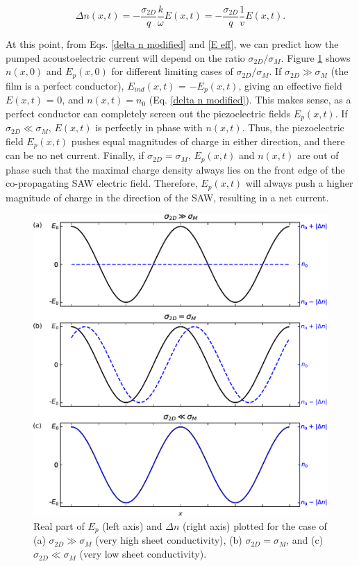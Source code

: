 \documentclass[double,12pt,1in]{beavtex}
\begin{document}
\begin{equation}
    \Delta n(x,t) = -\frac{\sigma_{2D}}{q} \frac{k}{\omega} E(x,t) = -\frac{\sigma_{2D}}{q} \frac{1}{v}E(x,t). \label{delta n modified}
\end{equation}

At this point, from Eqs. \ref{delta n modified} and \ref{E eff}, we can predict how the pumped acoustoelectric current will depend on the ratio $\sigma_{2D}/\sigma_M$. Figure \ref{piezoelectric field and delta n} shows $n(x,0)$ and $E_p(x,0)$ for different limiting cases of $\sigma_{2D}/\sigma_M$. If $\sigma_{2D} \gg \sigma_M$ (the film is a perfect conductor), $E_{ind}(x,t)$ = $-E_p(x,t)$, giving an effective field $E(x,t)$ = 0, and $n(x,t) = n_0$ (Eq. \ref{delta n modified}). This makes sense, as a perfect conductor can completely screen out the piezoelectric fields $E_p(x,t)$. If $\sigma_{2D} \ll \sigma_M$, $E(x,t)$ is perfectly in phase with $n(x,t)$. Thus, the piezoelectric field $E_p(x,t)$ pushes equal magnitudes of charge in either direction, and there can be no net current. Finally, if $\sigma_{2D} = \sigma_M$, $E_p(x,t)$ and $n(x,t)$ are out of phase such that the maximal charge density always lies on the front edge of the co-propagating SAW electric field. Therefore, $E_p(x,t)$ will always push a higher magnitude of charge in the direction of the SAW, resulting in a net current.



\begin{figure}
    \includegraphics{piezoelectric field and delta n edited.pdf}
    \caption{Real part of $E_p$ (left axis) and $\Delta n$ (right axis) plotted for the case of (a) $\sigma_{2D} \gg \sigma_M$ (very high sheet conductivity), (b) $\sigma_{2D} = \sigma_M$, and (c) $\sigma_{2D} \ll \sigma_M$ (very low sheet conductivity).}
    \label{piezoelectric field and delta n}
\end{figure}
\end{document}

